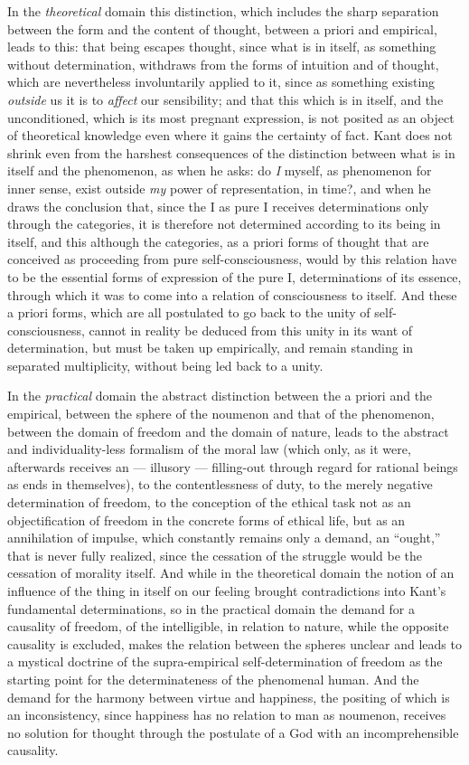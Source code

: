 In the \emph{theoretical} domain this distinction, which includes the
sharp separation between the form and the content of thought, between
a priori and empirical, leads to this: that being escapes thought,
since what is in itself, as something without determination, withdraws
from the forms of intuition and of thought, which are nevertheless
involuntarily applied to it, since as something existing \emph{outside}
us it is to \emph{affect} our sensibility; and that this which is in
itself, and the unconditioned, which is its most pregnant expression,
is not posited as an object of theoretical knowledge even where it
gains the certainty of fact. Kant does not shrink even from
the harshest consequences of the distinction between what is in itself
and the phenomenon, as when he asks: do \emph{I} myself, as phenomenon
for inner sense, exist outside \emph{my} power of representation, in
time?, and when he draws the conclusion that, since the I as pure I
receives determinations only through the categories, it is therefore
not determined according to its being in itself, and this although the
categories, as a priori forms of thought that are conceived as
proceeding from pure self-consciousness, would by this relation have to
be the essential forms of expression of the pure I, determinations of
its essence, through which it was to come into a relation of
consciousness to itself. And these a priori forms, which are all
postulated to go back to the unity of self-consciousness, cannot in
reality be deduced from this unity in its want of determination, but
must be taken up empirically, and remain standing in separated
multiplicity, without being led back to a unity.

In the \emph{practical} domain the abstract distinction between the a
priori and the empirical, between the sphere of the noumenon and that
of the phenomenon, between the domain of freedom and the domain of
nature, leads to the abstract and individuality-less formalism of the
moral law (which only, as it were, afterwards receives an ---
illusory --- filling-out through regard for rational beings as ends in
themselves), to the contentlessness of duty, to the merely negative
determination of freedom, to the conception of the ethical task not as
an objectification of freedom in the concrete forms of ethical life,
but as an annihilation of impulse, which constantly remains only a
demand, an ``ought,'' that is never fully realized, since the cessation
of the struggle would be the cessation of morality itself. And while
in the theoretical domain the notion of an influence of the thing in
itself on our feeling brought contradictions into Kant's fundamental
determinations, so in the practical domain the demand for a causality
of freedom, of the intelligible, in relation to nature, while the
opposite causality is excluded, makes the relation between the spheres
unclear and leads to a mystical doctrine of the
supra-empirical self-determination of freedom as the starting point for
the determinateness of the phenomenal human. And the demand for the
harmony between virtue and happiness, the positing of which is an
inconsistency, since happiness has no relation to man as noumenon,
receives no solution for thought through the postulate of a God with an
incomprehensible causality.

